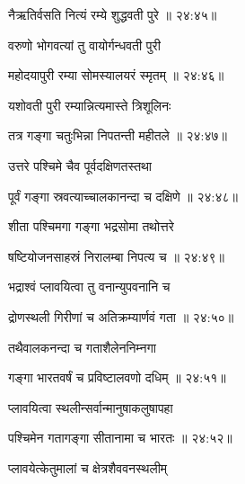 
{\devanagarifont नैऋतिर्वसति नित्यं रम्ये शुद्धवती पुरे {॥ २४:४५॥} \veg\dontdisplaylinenum }%
 
{\devanagarifont वरुणो भोगवत्यां तु वायोर्गन्धवती पुरी \thinspace{\dandab} \dontdisplaylinenum }%
 

{\devanagarifont महोदयापुरी रम्या सोमस्यालयरं स्मृतम् {॥ २४:४६॥} \veg\dontdisplaylinenum }%
 
{\devanagarifont यशोवती पुरी रम्यान्नित्यमास्ते त्रिशूलिनः \thinspace{\dandab} \dontdisplaylinenum }%
 

{\devanagarifont तत्र गङ्गा चतुःभिन्ना निपतन्ती महीतले {॥ २४:४७॥} \veg\dontdisplaylinenum }%
 
{\devanagarifont उत्तरे पश्चिमे चैव पूर्वदक्षिणतस्तथा \thinspace{\dandab} \dontdisplaylinenum }%
 

{\devanagarifont पूर्वं गङ्गा स्रवत्याच्चालकानन्दा च दक्षिणे {॥ २४:४८॥} \veg\dontdisplaylinenum }%
 
{\devanagarifont शीता पश्चिमगा गङ्गा भद्रसोमा तथोत्तरे \thinspace{\dandab} \dontdisplaylinenum }%
 

{\devanagarifont षष्टियोजनसाहस्रं निरालम्बा निपत्य च {॥ २४:४९॥} \veg\dontdisplaylinenum }%
 
{\devanagarifont भद्राश्वं प्लावयित्वा तु वनान्युपवनानि च \thinspace{\dandab} \dontdisplaylinenum }%
 

{\devanagarifont द्रोणस्थली गिरीणां च अतिक्रम्यार्णवं गता {॥ २४:५०॥} \veg\dontdisplaylinenum }%
 
{\devanagarifont तथैवालकनन्दा च गताशैलेननिम्नगा \thinspace{\dandab} \dontdisplaylinenum }%
 

{\devanagarifont गङ्गा भारतवर्षं च प्रविष्टालवणो दधिम् {॥ २४:५१॥} \veg\dontdisplaylinenum }%
 
{\devanagarifont प्लावयित्वा स्थलीन्सर्वान्मानुषाकलुषापहा \thinspace{\dandab} \dontdisplaylinenum }%
 

{\devanagarifont पश्चिमेन गतागङ्गा सीतानामा च भारतः {॥ २४:५२॥} \veg\dontdisplaylinenum }%
 
{\devanagarifont प्लावयेत्केतुमालां च क्षेत्रशैववनस्थलीम् \thinspace{\dandab} \dontdisplaylinenum }%
 
